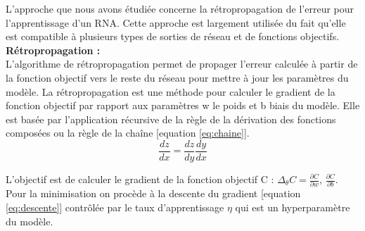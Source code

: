 L'approche que nous avons étudiée concerne la rétropropagation de l'erreur pour l'apprentissage d'un RNA. Cette approche est largement utilisée du fait qu'elle est compatible à plusieurs types de sorties de réseau et de  fonctions objectifs.\\
\smallskip
\textbf{Rétropropagation :}\\

\qquad L'algorithme de  rétropropagation permet de propager l'erreur calculée à partir de la fonction objectif vers le reste du réseau pour mettre à jour les paramètres du modèle. La rétropropagation est une méthode pour calculer le gradient de la fonction objectif par rapport aux paramètres w le poids et b biais du modèle. Elle est basée par l'application récursive de la règle de la dérivation des fonctions composées ou la règle de la chaîne [equation \ref{eq:chaine}].
\begin{equation}
\label{eq:chaine}
\frac{dz}{dx} = \frac{dz}{dy} \frac{dy}{dx}
\end{equation}


L'objectif est  de calculer le gradient de la fonction objectif C : $\Delta_\theta C =\frac{\partial{C}}{\partial{w}}, \, \frac{\partial{C}}{\partial{b}} $.
Pour la minimisation on procède à la descente du gradient [equation \ref{eq:descente}] contrôlée par le taux d'apprentissage $\eta$ qui est un hyperparamètre du modèle.

